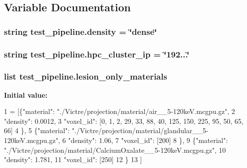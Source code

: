 \subsection{Variable Documentation}
\hypertarget{namespacetest__pipeline_ae1187c73a8652306ffcb6026d1c447a9}{
\subsubsection[{density}]{\setlength{\rightskip}{0pt plus 5cm}string test\-\_\-pipeline.\-density = \char`\"{}dense\char`\"{}}}\label{namespacetest__pipeline_ae1187c73a8652306ffcb6026d1c447a9}
\hypertarget{namespacetest__pipeline_af92fee384c18b13c6673a89759d43ed0}{
\subsubsection[{hpc\-\_\-cluster\-\_\-ip}]{\setlength{\rightskip}{0pt plus 5cm}string test\-\_\-pipeline.\-hpc\-\_\-cluster\-\_\-ip = \char`\"{}192...\char`\"{}}}\label{namespacetest__pipeline_af92fee384c18b13c6673a89759d43ed0}
\hypertarget{namespacetest__pipeline_a9b60cd1b189b1d4b7ed5d792e12598db}{
\subsubsection[{lesion\-\_\-only\-\_\-materials}]{\setlength{\rightskip}{0pt plus 5cm}list test\-\_\-pipeline.\-lesion\-\_\-only\-\_\-materials}}\label{namespacetest__pipeline_a9b60cd1b189b1d4b7ed5d792e12598db}
{\bfseries Initial value\-:}
\begin{DoxyCode}
1 = [\{\textcolor{stringliteral}{"material"}: \textcolor{stringliteral}{"./Victre/projection/material/air\_\_5-120keV.mcgpu.gz"},
2                           \textcolor{stringliteral}{"density"}: 0.0012,
3                           \textcolor{stringliteral}{"voxel\_id"}: [0, 1, 2, 29, 33, 88, 40, 125, 150, 225, 95, 50, 65, 66]
4                           \},
5                          \{\textcolor{stringliteral}{"material"}: \textcolor{stringliteral}{"./Victre/projection/material/glandular\_\_5-120keV.mcgpu.gz"},
6                           \textcolor{stringliteral}{"density"}: 1.06,
7                              \textcolor{stringliteral}{"voxel\_id"}: [200]
8                           \},
9                          \{\textcolor{stringliteral}{"material"}: \textcolor{stringliteral}{"./Victre/projection/material/CalciumOxalate\_\_5-120keV.mcgpu.gz"},
10                           \textcolor{stringliteral}{"density"}: 1.781,
11                              \textcolor{stringliteral}{"voxel\_id"}: [250]
12                           \}
13                          ]
\end{DoxyCode}
